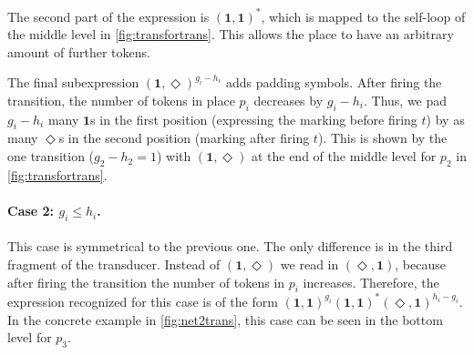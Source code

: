 The second part of the expression is $(\bm{1},\bm{1})^{\bm{*}}$, which is mapped to the self-loop of the middle level in \autoref{fig:transfortrans}. This allows the place to have an arbitrary amount of further tokens. 

The final subexpression $(\bm{1},\Diamond)^{g_{i}-h_{i}}$ adds padding symbols. After firing the transition, the number of tokens in place $p_{i}$ decreases by $g_{i}-h_{i}$. Thus, we pad $g_{i}-h_{i}$ many $\bm{1}$s in the first position (expressing the marking before firing $t$) by as many $\Diamond$s in the second position (marking after firing $t$). This is shown by the one transition ($g_{2}-h_{2} = 1$) with $(\bm{1},\Diamond)$ at the end of the middle level for $p_{2}$ in \autoref{fig:transfortrans}.

\paragraph{Case 2: $g_{i} \le h_{i}$.}
This case is symmetrical to the previous one. The only difference is in the third fragment of the transducer. Instead of $(\bm{1},\Diamond)$ we read in $(\Diamond,\bm{1})$, because after firing the transition the number of tokens in $p_{i}$ increases. Therefore, the expression recognized for this case is of the form $(\bm{1},\bm{1})^{g_{i}}(\bm{1},\bm{1})^{\bm{*}}(\Diamond,\bm{1})^{h_{i}-g_{i}}$. In the concrete example in \autoref{fig:net2trans}, this case can be seen in the bottom level for $p_{3}$.



